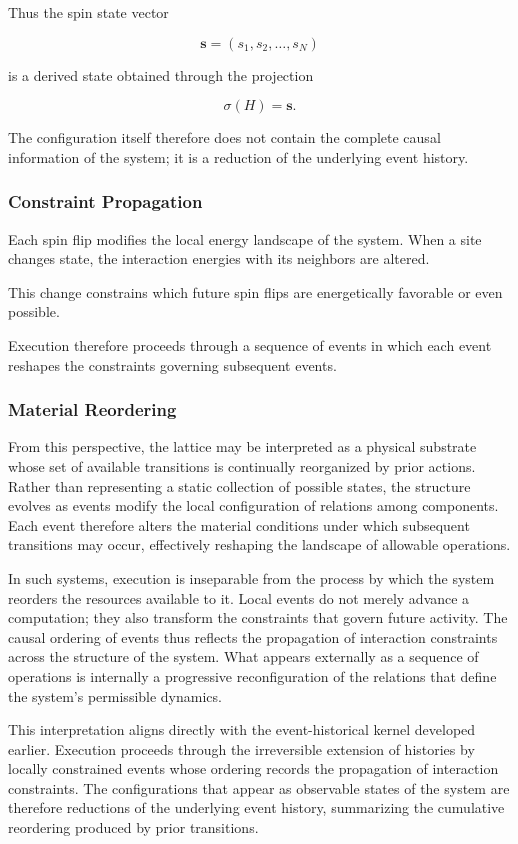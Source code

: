 \documentclass[12pt]{article}
\begin{document}
Thus the spin state vector

\[
\mathbf{s} = (s_1, s_2, \dots, s_N)
\]

is a derived state obtained through the projection

\[
\sigma(H) = \mathbf{s}.
\]

The configuration itself therefore does not contain the
complete causal information of the system; it is a reduction
of the underlying event history.

\subsubsection{Constraint Propagation}

Each spin flip modifies the local energy landscape of the
system. When a site changes state, the interaction energies
with its neighbors are altered.

This change constrains which future spin flips are energetically
favorable or even possible.

Execution therefore proceeds through a sequence of events in
which each event reshapes the constraints governing subsequent
events.

\subsubsection{Material Reordering}

From this perspective, the lattice may be interpreted as a
physical substrate whose set of available transitions is
continually reorganized by prior actions. Rather than
representing a static collection of possible states, the
structure evolves as events modify the local configuration
of relations among components. Each event therefore alters
the material conditions under which subsequent transitions
may occur, effectively reshaping the landscape of allowable
operations.

In such systems, execution is inseparable from the process
by which the system reorders the resources available to it.
Local events do not merely advance a computation; they also
transform the constraints that govern future activity.
The causal ordering of events thus reflects the propagation
of interaction constraints across the structure of the
system. What appears externally as a sequence of operations
is internally a progressive reconfiguration of the relations
that define the system’s permissible dynamics.

This interpretation aligns directly with the event-historical
kernel developed earlier. Execution proceeds through the
irreversible extension of histories by locally constrained
events whose ordering records the propagation of interaction
constraints. The configurations that appear as observable
states of the system are therefore reductions of the
underlying event history, summarizing the cumulative
reordering produced by prior transitions.
\end{document}
